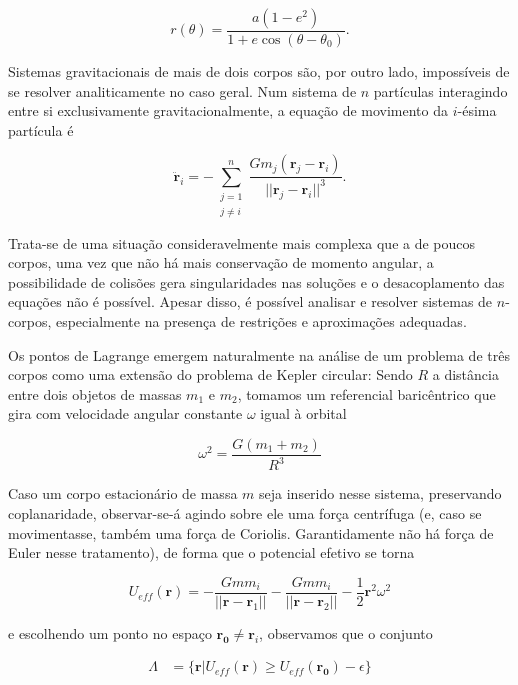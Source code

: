 \begin{equation}
    r(\theta) = \frac{a(1 - e^2)}{1 + e\cos (\theta - \theta_0)}.
\end{equation}

Sistemas gravitacionais de mais de dois corpos são, por outro lado, impossíveis de se resolver analiticamente no caso geral. Num sistema de $n$ partículas interagindo entre si exclusivamente gravitacionalmente, a equação de movimento da $i$-ésima partícula é 

\begin{equation}
    \ddot{\mathbf{r}}_i=-\sum_{\substack{j=1\\j \neq i}}^{n} \frac{Gm_j(\mathbf{r}_j - \mathbf{r}_i)}{||\mathbf{r}_j - \mathbf{r}_i||^3}.
\end{equation} 

Trata-se de uma situação consideravelmente mais complexa que a de poucos corpos, uma vez que não há mais conservação de momento angular, a possibilidade de colisões gera singularidades nas soluções e o desacoplamento das equações não é possível. Apesar disso, é possível analisar e resolver sistemas de $n$-corpos, especialmente na presença de restrições e aproximações adequadas.

Os pontos de Lagrange emergem naturalmente na análise de um problema de três corpos como uma extensão do problema de Kepler circular: Sendo $R$ a distância entre dois objetos de massas $m_1$ e $m_2$, tomamos um referencial baricêntrico que gira com velocidade angular constante $\omega$ igual à orbital

\begin{equation}
    \omega^2 = \frac{G(m_1 + m_2)}{R^3}
\end{equation}

Caso um corpo estacionário de massa $m$ seja inserido nesse sistema, preservando coplanaridade, observar-se-á agindo sobre ele uma força centrífuga (e, caso se movimentasse, também uma força de Coriolis. Garantidamente não há força de Euler nesse tratamento), de forma que o potencial efetivo se torna

\begin{equation}
    U_{eff}(\mathbf{r}) = - \frac{Gmm_i}{||\mathbf{r} - \mathbf{r}_1||} - \frac{Gmm_i}{||\mathbf{r} - \mathbf{r}_2||} - \frac{1}{2}\mathbf{r}^2\omega^2
\end{equation}

e escolhendo um ponto no espaço $\mathbf{r_0} \neq \mathbf{r}_i$, observamos que o conjunto

\begin{align} 
    \Lambda &= \{\mathbf{r} | U_{eff}(\mathbf{r}) \geq U_{eff}(\mathbf{r_0}) - \epsilon\}
\end{align}

